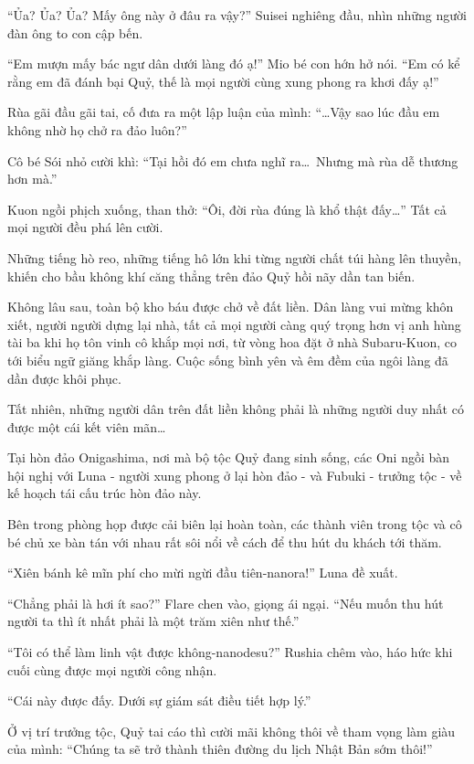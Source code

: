 \documentclass[../main.tex]{subfiles}
\begin{document}
``Ủa? Ủa? Ủa? Mấy ông này ở đâu ra vậy?'' Suisei nghiêng đầu, nhìn những người đàn ông to con cập bến.

``Em mượn mấy bác ngư dân dưới làng đó ạ!'' Mio bé con hớn hở nói. ``Em có kể rằng em đã đánh bại Quỷ, thế là mọi người cùng xung phong ra khơi đấy ạ!''

Rùa gãi đầu gãi tai, cố đưa ra một lập luận của mình: ``\dots Vậy sao lúc đầu em không nhờ họ chở ra đảo luôn?''

Cô bé Sói nhỏ cười khì: ``Tại hồi đó em chưa nghĩ ra\dots\ Nhưng mà rùa dễ thương hơn mà.''

Kuon ngồi phịch xuống, than thở: ``Ôi, đời rùa đúng là khổ thật đấy\dots'' Tất cả mọi người đều phá lên cười.

Những tiếng hò reo, những tiếng hô lớn khi từng người chất túi hàng lên thuyền, khiến cho bầu không khí căng thẳng trên đảo Quỷ hồi nãy dần tan biến.

Không lâu sau, toàn bộ kho báu được chở về đất liền. Dân làng vui mừng khôn xiết, người người dựng lại nhà, tất cả mọi người càng quý trọng hơn vị anh hùng tài ba khi họ tôn vinh cô khắp mọi nơi, từ vòng hoa đặt ở nhà Subaru-Kuon, co tới biểu ngữ giăng khắp làng. Cuộc sống bình yên và êm đềm của ngôi làng đã dần được khôi phục.

Tất nhiên, những người dân trên đất liền không phải là những người duy nhất có được một cái kết viên mãn\dots

Tại hòn đảo Onigashima, nơi mà bộ tộc Quỷ đang sinh sống, các Oni ngồi bàn hội nghị với Luna - người xung phong ở lại hòn đảo - và Fubuki - trưởng tộc - về kế hoạch tái cấu trúc hòn đảo này.

Bên trong phòng họp được cải biên lại hoàn toàn, các thành viên trong tộc và cô bé chủ xe bàn tán với nhau rất sôi nổi về cách để thu hút du khách tới thăm.

``Xiên bánh kê mĩn phí cho mừi ngừi đầu tiên-nanora!'' Luna đề xuất.

``Chẳng phải là hơi ít sao?'' Flare chen vào, giọng ái ngại. ``Nếu muốn thu hút người ta thì ít nhất phải là một trăm xiên như thế.''

``Tôi có thể làm linh vật được không-nanodesu?'' Rushia chêm vào, háo hức khi cuối cùng được mọi người công nhận.

``Cái này được đấy. Dưới sự giám sát điều tiết hợp lý.''

Ở vị trí trưởng tộc, Quỷ tai cáo thì cười mãi không thôi về tham vọng làm giàu của mình: ``Chúng ta sẽ trở thành thiên đường du lịch Nhật Bản sớm thôi!''
\end{document}
